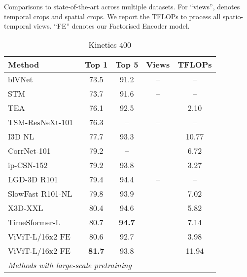 \documentclass[10pt,twocolumn,letterpaper]{article}
\begin{document}
\begin{table*}[tb]
	\caption{Comparisons to state-of-the-art across multiple datasets. For ``views'',  denotes  temporal crops and  spatial crops.
	We report the TFLOPs to process all spatio-temporal views.
	``FE'' denotes our Factorised Encoder model.
	}
	\vspace{0.2\baselineskip}
	\begin{subtable}[t]{.40\linewidth}
		\centering
		\caption{Kinetics 400}
    	\setlength{\tabcolsep}{4pt} \renewcommand*{\arraystretch}{1.11}  

		\vspace{-0.3\baselineskip}
		\scriptsize{
			\begin{tabular}{lcccc}
				\toprule
				Method 																			 & Top 1                & Top 5         & Views 	& TFLOPs \\
				\midrule
				blVNet~\cite{fan_blvnet_neurips_2019}							  & 73.5 				  & 91.2  & --  & --\\ 
				STM~\cite{jiang_stm_iccv_2019}										& 73.7 					& 91.6	& -- & -- \\
				TEA~\cite{li_tea_cvpr_2020}												& 76.1					& 92.5 &  & 2.10 \\  TSM-ResNeXt-101~\cite{lin_tsm_cvpr_2019}						  & 76.3				 & -- &  -- & -- \\
				I3D NL~\cite{wang_cvpr_2018}										 & 77.7                  & 93.3         		 &   & 10.77     \\  CorrNet-101~\cite{wang_corrnet_cvpr_2020}					  & 79.2				 & --			 		 & 	& 6.72	 \\  ip-CSN-152~\cite{tran_iccv_2019}									&  79.2					& 93.8				& 	& 3.27	 \\  LGD-3D R101~\cite{qiu_lgd_cvpr_2019}							&  79.4				    & 94.4			 		&  --	& --					\\  
				SlowFast R101-NL~\cite{feichtenhofer_iccv_2019}       		&  79.8                 &  93.9                   &     & 7.02   \\  X3D-XXL~\cite{feichtenhofer_cvpr_2020}      					&  80.4					&  94.6			  		&    & 5.82   \\
				TimeSformer-L~\cite{bertasius_arxiv_2021}					  	& 80.7				& \textbf{94.7}					&  & 7.14 \\
				ViViT-L/16x2 FE 														  	 &  80.6 				& 92.7 &    & 3.98 \\  ViViT-L/16x2 FE 															& \textbf{81.7} 	&  93.8  &  &  11.94 \\  \midrule
				\multicolumn{4}{l}{\textit{Methods with large-scale pretraining}}                                \\ 

\end{tabular}}
\end{subtable}
\end{table*}
\end{document}
